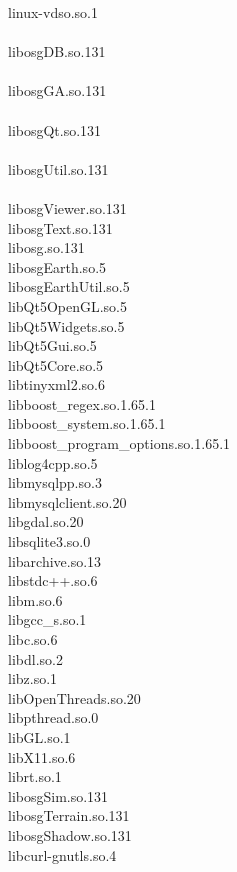 \begin{multicols}{2}
linux-vdso.so.1 \\ \\
libosgDB.so.131 \\ \\
libosgGA.so.131 \\ \\
libosgQt.so.131 \\ \\
libosgUtil.so.131 \\ \\
libosgViewer.so.131 \\
libosgText.so.131 \\
libosg.so.131 \\
libosgEarth.so.5 \\
libosgEarthUtil.so.5 \\
libQt5OpenGL.so.5 \\
libQt5Widgets.so.5 \\
libQt5Gui.so.5 \\
libQt5Core.so.5 \\
libtinyxml2.so.6 \\
libboost\_regex.so.1.65.1 \\
libboost\_system.so.1.65.1 \\
libboost\_program\_options.so.1.65.1 \\
liblog4cpp.so.5 \\
libmysqlpp.so.3 \\
libmysqlclient.so.20 \\
libgdal.so.20 \\
libsqlite3.so.0 \\
libarchive.so.13 \\
libstdc++.so.6 \\
libm.so.6 \\
libgcc\_s.so.1 \\
libc.so.6 \\
libdl.so.2 \\
libz.so.1 \\
libOpenThreads.so.20 \\
libpthread.so.0 \\
libGL.so.1 \\
libX11.so.6 \\
librt.so.1 \\
libosgSim.so.131 \\
libosgTerrain.so.131 \\
libosgShadow.so.131 \\
libcurl-gnutls.so.4 \\

\end{multicols}
